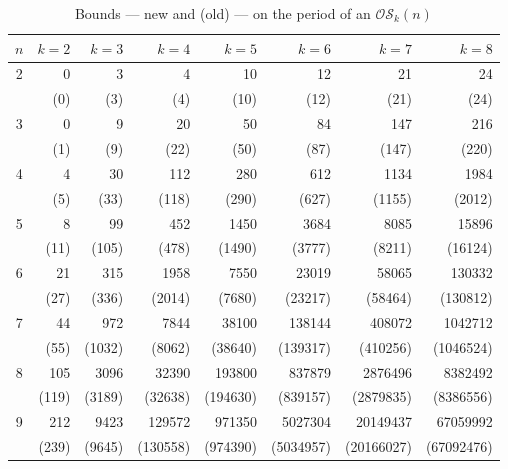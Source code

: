 \documentclass[a4paper,11pt]{article}
\begin{document}
\begin{table}[htb]
\centering \caption{Bounds --- new and (old) --- on the period of an $\mathcal{OS}_k(n)$}
\label{table:new_OS_periods_bounds}
\begin{footnotesize}
\begin{tabular}{crrrrrrr} \hline
$n$ & $k=2$   & $k=3$ & $k=4$   & $k=5$   & $k=6$    & $k=7$     & $k=8$     \\ \hline
2   & 0       & 3     & 4       & 10      & 12       & 21        & 24        \\
    & (0)     & (3)   & (4)     & (10)    & (12)     & (21)      & (24)      \\ \hline
3   & 0       & 9     & 20      & 50      & 84       & 147       & 216       \\
    & (1)     & (9)   & (22)    & (50)    & (87)     & (147)     & (220)     \\ \hline
4   & 4       & 30    & 112     & 280     & 612      & 1134      & 1984      \\
    & (5)     & (33)  & (118)   & (290)   & (627)    & (1155)    & (2012)    \\ \hline
5   & 8       & 99    & 452     & 1450    & 3684     & 8085      & 15896     \\
    & (11)    & (105) & (478)   & (1490)  & (3777)   & (8211)    & (16124)   \\ \hline
6   & 21      & 315   & 1958    & 7550    & 23019    & 58065     & 130332    \\
    & (27)    & (336) & (2014)  & (7680)  & (23217)  & (58464)   & (130812)  \\ \hline
7   & 44      & 972   & 7844    & 38100   & 138144   & 408072    & 1042712   \\
    & (55)    & (1032)& (8062)  & (38640) & (139317) & (410256)  & (1046524) \\ \hline
8   & 105     & 3096  & 32390   & 193800  & 837879   & 2876496   & 8382492   \\
    & (119)   & (3189)& (32638) & (194630)& (839157) & (2879835) & (8386556) \\ \hline
9   & 212     & 9423  & 129572  & 971350  & 5027304  & 20149437  & 67059992  \\
    & (239)   & (9645)& (130558)& (974390)& (5034957)& (20166027)& (67092476)\\ \hline
\end{tabular}
\end{footnotesize}
\end{table}
\end{document}
